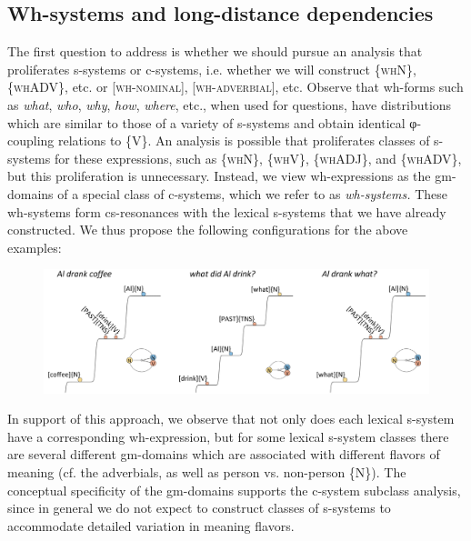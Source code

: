 \subsection{Wh-systems and long-distance dependencies}

The first question to address is whether we should pursue an analysis that proliferates s-systems or c-systems, i.e. whether we will construct \{\textsc{whN}\}, \{\textsc{whADV}\}, etc. or [\textsc{wh-nominal}], [\textsc{wh-adverbial}], etc. Observe that wh-forms such as \textit{what}, \textit{who}, \textit{why}, \textit{how}, \textit{where}, etc., when used for questions, have distributions which are similar to those of a variety of s-systems and obtain identical φ-coupling relations to \{V\}. An analysis is possible that proliferates classes of s-systems for these expressions, such as \{\textsc{whN}\}, \{\textsc{whV}\}, \{\textsc{whADJ}\}, and \{\textsc{whADV}\}, but this proliferation is unnecessary. Instead, we view wh-expressions as the gm-domains of a special class of c-systems, which we refer to as \textit{wh-systems.} These wh-systems form cs-resonances with the lexical s-systems that we have already constructed. We thus propose the following configurations for the above examples:

  
\begin{figure}
\includegraphics[width=\textwidth]{figures/Tilsen-img158.png}
\caption{\missingcaption}
\label{fig:}
\end{figure}
 

  In support of this approach, we observe that not only does each lexical s-system have a corresponding wh-expression, but for some lexical s-system classes there are several different gm-domains which are associated with different flavors of meaning (cf. the adverbials, as well as person vs. non-person \{N\}). The conceptual specificity of the gm-domains supports the c-system subclass analysis, since in general we do not expect to construct classes of s-systems to accommodate detailed variation in meaning flavors.

